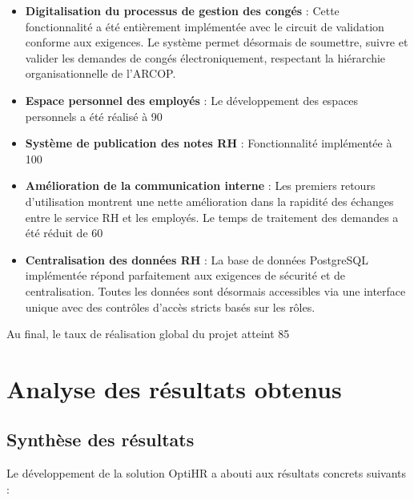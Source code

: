 \begin{itemize}
    \item \textbf{Digitalisation du processus de gestion des congés} : Cette fonctionnalité a été entièrement implémentée avec le circuit de validation conforme aux exigences. Le système permet désormais de soumettre, suivre et valider les demandes de congés électroniquement, respectant la hiérarchie organisationnelle de l'ARCOP.
    
    \item \textbf{Espace personnel des employés} : Le développement des espaces personnels a été réalisé à 90%
    
    \item \textbf{Système de publication des notes RH} : Fonctionnalité implémentée à 100%
    
    \item \textbf{Amélioration de la communication interne} : Les premiers retours d'utilisation montrent une nette amélioration dans la rapidité des échanges entre le service RH et les employés. Le temps de traitement des demandes a été réduit de 60%
    
    \item \textbf{Centralisation des données RH} : La base de données PostgreSQL implémentée répond parfaitement aux exigences de sécurité et de centralisation. Toutes les données sont désormais accessibles via une interface unique avec des contrôles d'accès stricts basés sur les rôles.
\end{itemize}

Au final, le taux de réalisation global du projet atteint 85%

\section{Analyse des résultats obtenus}

\subsection{Synthèse des résultats}
Le développement de la solution OptiHR a abouti aux résultats concrets suivants :

